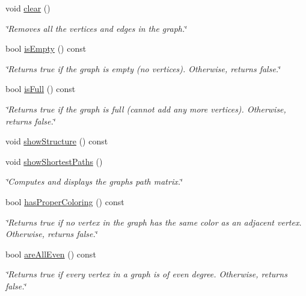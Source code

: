 \begin{DoxyCompactItemize}
void \hyperlink{class_weighted_graph_a26890ebf74d23821a6e4dbcf803b5002}{clear} ()
\begin{DoxyCompactList}\small\item\em \char`\"{}\+Removes all the vertices and edges in the graph.\char`\"{} \end{DoxyCompactList}\item 
bool \hyperlink{class_weighted_graph_a1c03a0f68447cf88fed97c2076501702}{is\+Empty} () const 
\begin{DoxyCompactList}\small\item\em \char`\"{}\+Returns true if the graph is empty (no vertices). Otherwise, returns false.\char`\"{} \end{DoxyCompactList}\item 
bool \hyperlink{class_weighted_graph_a22e56836e3967031a657cfa9ea5b9843}{is\+Full} () const 
\begin{DoxyCompactList}\small\item\em \char`\"{}\+Returns true if the graph is full (cannot add any more vertices). Otherwise, returns false.\char`\"{} \end{DoxyCompactList}\item 
void \hyperlink{class_weighted_graph_ad7f20a989073ea5401d504d944182347}{show\+Structure} () const 
\item 
void \hyperlink{class_weighted_graph_a8e6ea9adc87345052786eec67a5f9164}{show\+Shortest\+Paths} ()
\begin{DoxyCompactList}\small\item\em \char`\"{}\+Computes and displays the graph\textquotesingle{}s path matrix.\char`\"{} \end{DoxyCompactList}\item 
bool \hyperlink{class_weighted_graph_a60be8bab10a9142846093cb768855efd}{has\+Proper\+Coloring} () const 
\begin{DoxyCompactList}\small\item\em \char`\"{}\+Returns true if no vertex in the graph has the same color as an adjacent vertex. Otherwise, returns false.\char`\"{} \end{DoxyCompactList}\item 
bool \hyperlink{class_weighted_graph_a03884e32b9e093b10e3a44add7eaa928}{are\+All\+Even} () const 
\begin{DoxyCompactList}\small\item\em \char`\"{}\+Returns true if every vertex in a graph is of even degree. Otherwise, returns false.\char`\"{} \end{DoxyCompactList}\end{DoxyCompactItemize}
